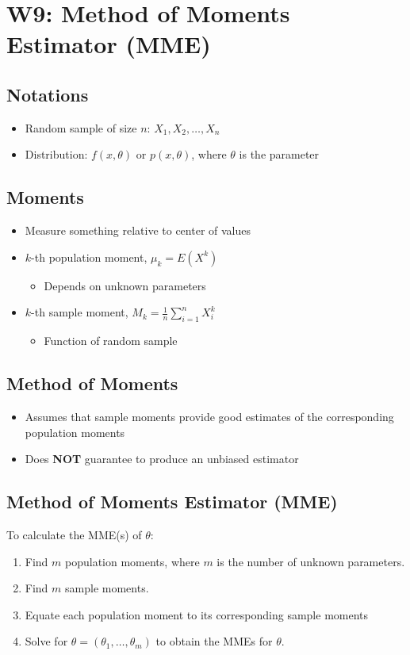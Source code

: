 \documentclass[a4paper]{article}
\begin{document}
\section{W9: Method of Moments Estimator (MME)}
\subsection{Notations}
\begin{itemize}
    \item Random sample of size $n$: $X_{1}, X_{2}, \ldots , X_{n}$
    \item Distribution: $f(x, \theta)$ or $p(x, \theta)$, where $\theta$ is the parameter
\end{itemize}
\subsection{Moments}
\begin{itemize}
    \item Measure something relative to center of values
    \item $k$-th population moment, $\mu_{k} = E(X^k)$
    \begin{itemize}[label=$\circ$]
        \item Depends on unknown parameters
    \end{itemize}
    \item $k$-th sample moment, $\displaystyle M_{k} = \frac{1}{n}\sum_{i=1}^{n}X_{i}^{k}$
    \begin{itemize}[label=$\circ$]
        \item Function of random sample
    \end{itemize}
\end{itemize}
\subsection{Method of Moments}
\begin{itemize}
    \item Assumes that sample moments provide good estimates of the corresponding population moments
    \item Does \textbf{NOT} guarantee to produce an unbiased estimator
\end{itemize}
\subsection{Method of Moments Estimator (MME)}
To calculate the MME(s) of $\theta$:
\begin{enumerate}
    \item Find $m$ population moments, where $m$ is the number of unknown parameters.
    \item Find $m$ sample moments.
    \item Equate each population moment to its corresponding sample moments
    \item Solve for $\theta = (\theta_{1}, \ldots, \theta_{m})$ to obtain the MMEs for $\theta$.
\end{enumerate}
\newpage
\end{document}
